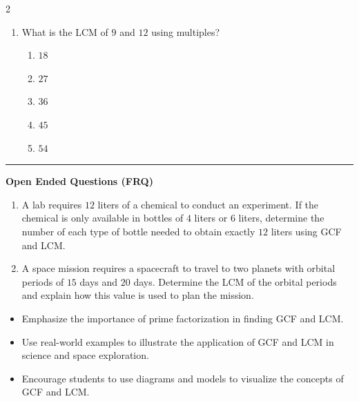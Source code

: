 \documentclass[10pt]{article}
\begin{document}
\begin{multicols}{2}
\begin{enumerate}[label=\textbf{Q\arabic*.}, leftmargin=*, itemsep=6pt, parsep=0pt]
  \item \small What is the LCM of $9$ and $12$ using multiples?
  \begin{enumerate}[label=(\Alph*), leftmargin=0.6cm, nosep, itemsep=2pt]
    \item $18$
    \item $27$
    \item $36$
    \item $45$
    \item $54$
  \end{enumerate}

\end{enumerate}
\end{multicols}

\vspace{-0.2cm}
\hrule
\vspace{0.2cm}
\textbf{\small Open Ended Questions (FRQ)}
\begin{enumerate}[label=\textbf{Q\arabic*.}, start=9, itemsep=5pt, topsep=0pt]

  \item \small A lab requires $12$ liters of a chemical to conduct an experiment. If the chemical is only available in bottles of $4$ liters or $6$ liters, determine the number of each type of bottle needed to obtain exactly $12$ liters using GCF and LCM. \vspace{2cm}

  \item \small A space mission requires a spacecraft to travel to two planets with orbital periods of $15$ days and $20$ days. Determine the LCM of the orbital periods and explain how this value is used to plan the mission. \vspace{2cm}

\end{enumerate}

\vfill

\begin{tcolorbox}[colback=blue!5, colframe=mainblue!50, title=\small \textbf{Chef's Tips}, fonttitle=\bfseries, bottom=1mm]
\begin{itemize}[noitemsep, topsep=2pt, leftmargin=0.5cm]
  \item \scriptsize Emphasize the importance of prime factorization in finding GCF and LCM.\item \scriptsize Use real-world examples to illustrate the application of GCF and LCM in science and space exploration.\item \scriptsize Encourage students to use diagrams and models to visualize the concepts of GCF and LCM.
\end{itemize}
\end{tcolorbox}
\end{document}
